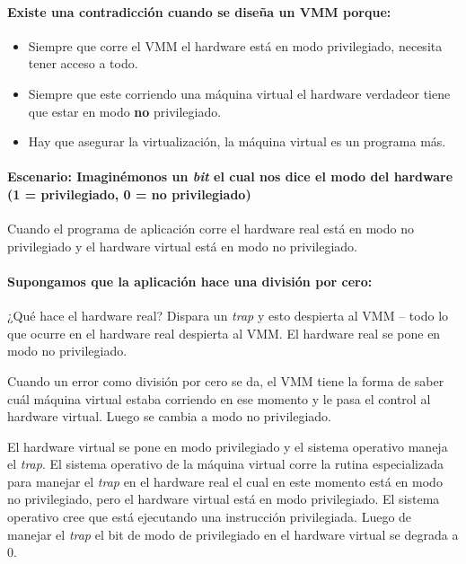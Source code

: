\documentclass[12pt, times]{simauth}
\begin{document}
\paragraph{Existe una contradicción cuando se diseña un VMM porque:}
\begin{itemize}
    \item Siempre que corre el VMM el hardware está en modo privilegiado, necesita tener acceso a todo.
    \item Siempre que este corriendo una máquina virtual el hardware verdadeor tiene que estar en modo \textbf{no} privilegiado.
    \item Hay que asegurar la virtualización, la máquina virtual es un programa más.
\end{itemize}

\paragraph{Escenario: Imaginémonos un \emph{bit} el cual nos dice el modo del hardware (1 = privilegiado, 0 = no privilegiado)}


Cuando el programa de aplicación corre el hardware real está en modo no privilegiado y el hardware virtual está en modo no privilegiado.

\paragraph{Supongamos que la aplicación hace una división por cero:} 
¿Qué hace el hardware real? Dispara un \emph{trap} y esto despierta al VMM -- todo lo que ocurre en el hardware real despierta al VMM. El hardware real se pone en modo no privilegiado.

Cuando un error como división por cero se da, el VMM tiene la forma de saber cuál máquina virtual estaba corriendo en ese momento y le pasa el control al hardware virtual. Luego se cambia a modo no privilegiado.

El hardware virtual se pone en modo privilegiado y el sistema operativo maneja el \emph{trap}. El sistema operativo de la máquina virtual corre la rutina especializada para manejar el \emph{trap} en el hardware real el cual en este momento está en modo no privilegiado, pero el hardware virtual está en modo privilegiado. El sistema operativo cree que está ejecutando una instrucción privilegiada. Luego de manejar el \emph{trap} el bit de modo de privilegiado en el hardware virtual se degrada a 0. 
\end{document}
